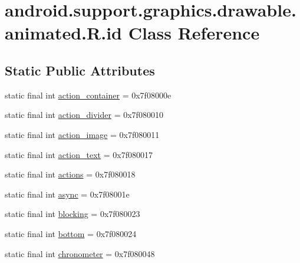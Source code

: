 \hypertarget{classandroid_1_1support_1_1graphics_1_1drawable_1_1animated_1_1_r_1_1id}{}\section{android.\+support.\+graphics.\+drawable.\+animated.\+R.\+id Class Reference}
\label{classandroid_1_1support_1_1graphics_1_1drawable_1_1animated_1_1_r_1_1id}
\subsection*{Static Public Attributes}
\begin{DoxyCompactItemize}
\item 
static final int \mbox{\hyperlink{classandroid_1_1support_1_1graphics_1_1drawable_1_1animated_1_1_r_1_1id_ad3a8b5e39a6727f8720761828138ad36}{action\+\_\+container}} = 0x7f08000e
\item 
static final int \mbox{\hyperlink{classandroid_1_1support_1_1graphics_1_1drawable_1_1animated_1_1_r_1_1id_a4af26dc65a6b402ba33678a7f89d8d5f}{action\+\_\+divider}} = 0x7f080010
\item 
static final int \mbox{\hyperlink{classandroid_1_1support_1_1graphics_1_1drawable_1_1animated_1_1_r_1_1id_a863126afa0357acc99cddb49182f4bfe}{action\+\_\+image}} = 0x7f080011
\item 
static final int \mbox{\hyperlink{classandroid_1_1support_1_1graphics_1_1drawable_1_1animated_1_1_r_1_1id_af05367c558932061cceefe3714a9a7c2}{action\+\_\+text}} = 0x7f080017
\item 
static final int \mbox{\hyperlink{classandroid_1_1support_1_1graphics_1_1drawable_1_1animated_1_1_r_1_1id_a9364b1d2e05fccd3dc7b3a7e37805370}{actions}} = 0x7f080018
\item 
static final int \mbox{\hyperlink{classandroid_1_1support_1_1graphics_1_1drawable_1_1animated_1_1_r_1_1id_aaf83309e2e73f818a1fbebb84bd5926d}{async}} = 0x7f08001e
\item 
static final int \mbox{\hyperlink{classandroid_1_1support_1_1graphics_1_1drawable_1_1animated_1_1_r_1_1id_a4b3c8c9b4c312a1f8cf398460635f01f}{blocking}} = 0x7f080023
\item 
static final int \mbox{\hyperlink{classandroid_1_1support_1_1graphics_1_1drawable_1_1animated_1_1_r_1_1id_af060c285d2f5312197fec5be98b0466c}{bottom}} = 0x7f080024
\item 
static final int \mbox{\hyperlink{classandroid_1_1support_1_1graphics_1_1drawable_1_1animated_1_1_r_1_1id_a57c4a9260d9b490170f2179498e023cc}{chronometer}} = 0x7f080048

\end{DoxyCompactItemize}
